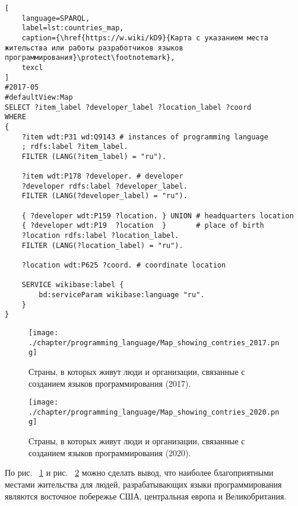 \begin{lstlisting}[
	language=SPARQL,
	label=lst:countries_map,
	caption={\href{https://w.wiki/kD9}{Карта с указанием места жительства или работы разработчиков языков программирования}\protect\footnotemark},
	texcl
]
#2017-05
#defaultView:Map
SELECT ?item_label ?developer_label ?location_label ?coord
WHERE
{
    ?item wdt:P31 wd:Q9143 # instances of programming language
    ; rdfs:label ?item_label.     
    FILTER (LANG(?item_label) = "ru"). 
  
    ?item wdt:P178 ?developer. # developer
    ?developer rdfs:label ?developer_label. 
    FILTER (LANG(?developer_label) = "ru"). 
      		
    { ?developer wdt:P159 ?location. } UNION # headquarters location
    { ?developer wdt:P19  ?location  }       # place of birth
    ?location rdfs:label ?location_label. 
    FILTER (LANG(?location_label) = "ru").
    
    ?location wdt:P625 ?coord. # coordinate location

    SERVICE wikibase:label {
        bd:serviceParam wikibase:language "ru".
    }   	
}
\end{lstlisting}

\begin{figure}[h]
\centering
	\texttt{[image: ./chapter/programming\_language/Map\_showing\_contries\_2017.png]}
	\caption{Страны, в которых живут люди и организации, связанные с созданием языков программирования (2017).}
	\label{fig:countries_2017}
\end{figure}
\begin{figure}
\centering
	\texttt{[image: ./chapter/programming\_language/Map\_showing\_contries\_2020.png]}
	\caption{Страны, в которых живут люди и организации, связанные с созданием языков программирования (2020).}
	\label{fig:countries_2020}
\end{figure}

\begin{marginfigure}
{
\setlength{\fboxsep}{0pt}%
\setlength{\fboxrule}{1pt}%
%
}
  \caption{Наиболее благоприятные страны для появления людей, способных к разработке языков программирования на 2020 год.}%
  \label{fig:countries_2_2020}%
\end{marginfigure}
По  рис. ~\ref{fig:countries_2017} и рис. ~\ref{fig:countries_2020} можно сделать вывод, что наиболее благоприятными местами жительства для людей, разрабатывающих языки программирования являются восточное побережье США, центральная европа и Великобритания.

